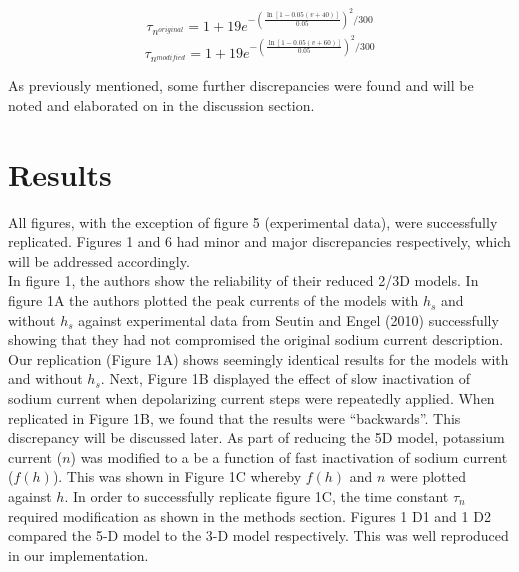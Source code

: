 \begin{center}
	$$\tau_{n^{original}} = 1 + 19 e^{- (\frac{{\ln[1 - 0.05 (v+40)]}}{0.05})^{2}/300}$$
	$$\tau_{n^{modified}} = 1 + 19 e^{- (\frac{{\ln[1 - 0.05 (v+60)]}}{0.05})^{2}/300}$$
\end{center}

As previously mentioned, some further discrepancies were found and will be noted and elaborated on in the discussion section. 


\section{Results}

All figures, with the exception of figure 5 (experimental data), were successfully replicated. Figures 1 and 6 had minor and major discrepancies respectively, which will be addressed accordingly.\\  
In figure 1, the authors show the reliability of their reduced 2/3D models. In figure 1A the authors plotted the peak currents of the models with $h_{s}$ and without $h_{s}$ against experimental data from Seutin and Engel (2010) successfully showing that they had not compromised the original sodium current description.  Our replication (Figure 1A) shows seemingly identical results for the models with and without $h_{s}$. Next, Figure 1B displayed the effect of slow inactivation of sodium current when depolarizing current steps were repeatedly applied. When replicated in Figure 1B, we found that the results were “backwards”. This discrepancy will be discussed later. As part of reducing the 5D model, potassium current ($n$) was modified to a be a function of fast inactivation of sodium current ($f(h)$). This was shown in Figure 1C whereby $f(h)$ and $n$ were plotted against $h$. In order to successfully replicate figure 1C, the time constant $\tau_n$ required modification as shown in the methods section. Figures 1 D1 and 1 D2 compared the 5-D model to the 3-D model respectively. This was well reproduced in our implementation.\\ 

